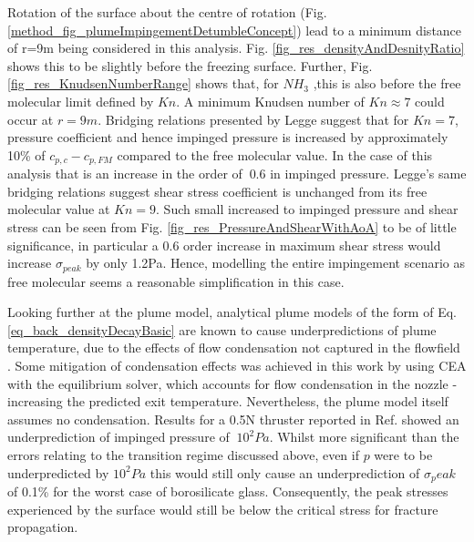 \documentclass[journal]{new-aiaa}
\begin{document}
Rotation of the surface about the centre of rotation (Fig. \ref{method_fig_plumeImpingementDetumbleConcept}) lead to a minimum distance of r=9m being considered in this analysis. Fig. \ref{fig_res_densityAndDesnityRatio} shows this to be slightly before the freezing surface. Further, Fig. \ref{fig_res_KnudsenNumberRange} shows that, for $NH_3$ ,this is also before the free molecular limit defined by $Kn$. A minimum Knudsen number of $Kn\approx 7$ could occur at $r=9m$. Bridging relations presented by Legge suggest that for $Kn=7$,  pressure coefficient and hence impinged pressure is increased by approximately 10\% of $c_{p,c} - c_{p,FM}$ compared to the free molecular value. In the case of this analysis that is an increase in the order of $~ 0.6$ in impinged pressure. Legge's same bridging relations suggest shear stress coefficient is unchanged from its free molecular value at $Kn=9$. Such small increased to impinged pressure and shear stress can be seen from Fig. \ref{fig_res_PressureAndShearWithAoA} to be of little significance, in particular a 0.6 order increase in maximum shear stress would increase $\sigma_{peak}$ by only 1.2Pa. Hence, modelling the entire impingement scenario as free molecular seems a reasonable simplification in this case. 








Looking further at the plume model, analytical plume models of the form of Eq. \ref{eq_back_densityDecayBasic} are known to cause underpredictions of plume temperature, due to the effects of flow condensation not captured in the flowfield \cite{dettleffBasicsPlumeImpingement2011}. Some mitigation of condensation effects was achieved in this work by using CEA with the equilibrium solver, which accounts for flow condensation in the nozzle - increasing the predicted exit temperature. Nevertheless, the plume model itself assumes no condensation. Results for a 0.5N thruster reported in Ref. \cite{boydModelingSmallHydrazine1990} showed an underprediction of impinged pressure of $~ 10^2 Pa$. Whilst more significant than the errors relating to the transition regime discussed above, even if $p$ were to be underpredicted by $10^2 Pa$ this would still only cause an underprediction of $\sigma_peak$ of 0.1\% for the worst case of borosilicate glass. Consequently, the peak stresses experienced by the surface would still be below the critical stress for fracture propagation.
\end{document}
